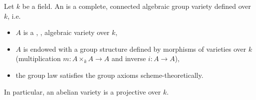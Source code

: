 \begin{definition} \label{definition:abelian_variety_over_a_field}
    Let $k$ be a field. An  is a complete, connected algebraic group variety defined over $k$, i.e.
    \begin{itemize}
        \item $A$ is a , ,  algebraic variety over $k$,
        \item $A$ is endowed with a group structure defined by morphisms of varieties over $k$ (multiplication $m: A \times_k A \to A$ and inverse $i: A \to A$),
        \item the group law satisfies the group axioms scheme-theoretically.
    \end{itemize}
    In particular, an abelian variety is a projective  over $k$.
\end{definition}
